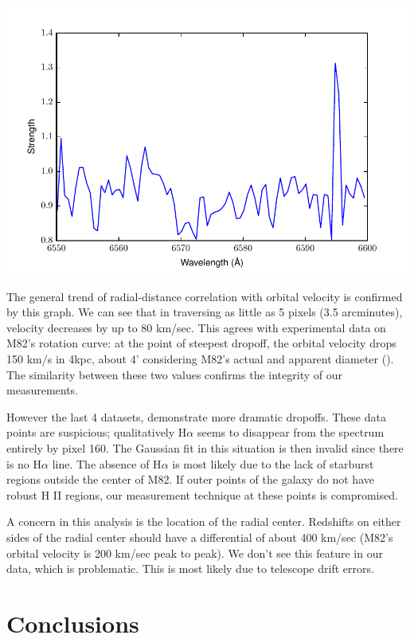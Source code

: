 \documentclass[useAMS,usenatbib]{mn2e}
\begin{document}
\includegraphics[width=\linewidth]{M82-l175u180-spectrum-6550-to-6600.pdf}


The general trend of radial-distance correlation with orbital velocity is confirmed by this graph. We can see that in traversing as little as 5 pixels (3.5 arcminutes), velocity decreases by up to 80 km/sec. This agrees with experimental data on M82's rotation curve: at the point of steepest dropoff, the orbital velocity drops 150 km/s in 4kpc, about 4' considering M82's actual and apparent diameter (\cite{rotation}). The similarity between these two values confirms the integrity of our measurements.

However the last 4 datasets,  demonstrate more dramatic dropoffs. These data points are suspicious; qualitatively H$\alpha$ seems to disappear from the spectrum entirely by pixel 160. The Gaussian fit in this situation is then invalid since there is no H$\alpha$ line. The absence of H$\alpha$ is most likely due to the lack of starburst regions outside the center of M82. If outer points of the galaxy do not have robust H II regions, our measurement technique at these points is compromised.

A concern in this analysis is the location of the radial center. Redshifts on either sides of the radial center should have a differential of about 400 km/sec (M82's orbital velocity is 200 km/sec peak to peak). We don't see this feature in our data, which is problematic. This is most likely due to telescope drift errors. 


\section*{Conclusions}
\end{document}

